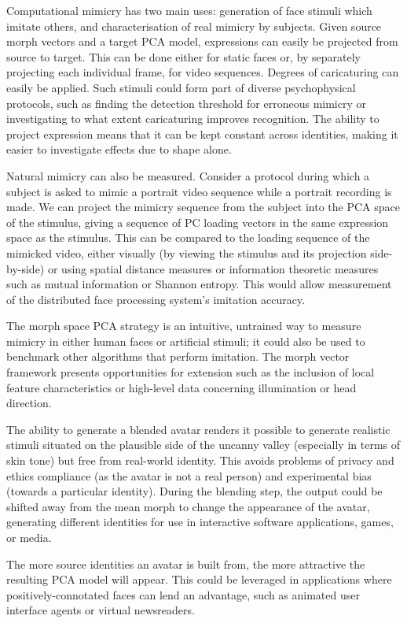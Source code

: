 \documentclass[runningheads]{llncs}
\begin{document}
Computational mimicry has two main uses: generation of face stimuli which imitate others, and characterisation of real mimicry by subjects.
Given source morph vectors and a target PCA model, expressions can easily be projected from source to target. This can be done either for static faces or, by separately projecting each individual frame, for video sequences. Degrees of caricaturing can easily be applied. Such stimuli could form part of diverse psychophysical protocols, such as finding the detection threshold for erroneous mimicry or investigating to what extent caricaturing improves recognition. The ability to project expression means that it can be kept constant across identities, making it easier to investigate effects due to shape alone.

Natural mimicry can also be measured. Consider a protocol during which a subject is asked to mimic a portrait video sequence while a portrait recording is made. We can project the mimicry sequence from the subject into the PCA space of the stimulus, giving a sequence of PC loading vectors in the same expression space as the stimulus. This can be compared to the loading sequence of the mimicked video, either visually (by viewing the stimulus and its projection side-by-side) or using spatial distance measures or information theoretic measures such as mutual information or Shannon entropy. This would allow measurement of the distributed\cite{haxby2000distributed} face processing system's imitation accuracy.

The morph space PCA strategy is an intuitive, untrained way to measure mimicry in either human faces or artificial stimuli\cite{cook2012self}; it could also be used to benchmark other algorithms that perform imitation. The morph vector framework presents opportunities for extension such as the inclusion of local feature characteristics or high-level data concerning illumination or head direction.


The ability to generate a blended avatar renders it possible to generate realistic stimuli situated on the plausible side of the uncanny valley\cite{mori1970uncanny} (especially in terms of skin tone) but free from real-world identity. This avoids problems of privacy and ethics compliance (as the avatar is not a real person) and experimental bias (towards a particular identity). During the blending step, the output could be shifted away from the mean morph to change the appearance of the avatar, generating different identities for use in interactive software applications, games, or media.

The more source identities an avatar is built from, the more attractive the resulting PCA model will appear\cite{grammer1994human}. This could be leveraged in applications where positively-connotated faces can lend an advantage, such as animated user interface agents or virtual newsreaders\cite{muller2001face}.







\end{document}
